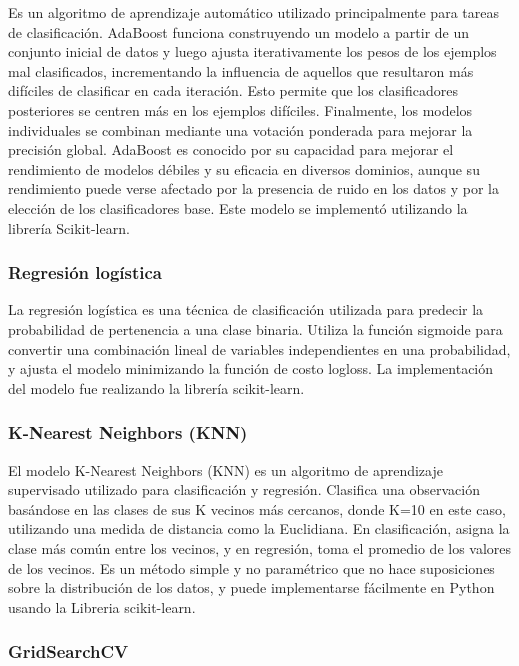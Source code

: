 \documentclass[
  number,
  preprint,
  3p,
  twocolumn]{elsarticle}
\begin{document}
Es un algoritmo de aprendizaje automático utilizado principalmente para
tareas de clasificación. AdaBoost funciona construyendo un modelo a
partir de un conjunto inicial de datos y luego ajusta iterativamente los
pesos de los ejemplos mal clasificados, incrementando la influencia de
aquellos que resultaron más difíciles de clasificar en cada iteración.
Esto permite que los clasificadores posteriores se centren más en los
ejemplos difíciles. Finalmente, los modelos individuales se combinan
mediante una votación ponderada para mejorar la precisión global.
AdaBoost es conocido por su capacidad para mejorar el rendimiento de
modelos débiles y su eficacia en diversos dominios, aunque su
rendimiento puede verse afectado por la presencia de ruido en los datos
y por la elección de los clasificadores base. Este modelo se implementó
utilizando la librería Scikit-learn.

\subsubsection{Regresión logística}\label{regresiuxf3n-loguxedstica}

La regresión logística es una técnica de clasificación utilizada para
predecir la probabilidad de pertenencia a una clase binaria. Utiliza la
función sigmoide para convertir una combinación lineal de variables
independientes en una probabilidad, y ajusta el modelo minimizando la
función de costo logloss. La implementación del modelo fue realizando la
librería scikit-learn.

\subsubsection{K-Nearest Neighbors (KNN)}\label{k-nearest-neighbors-knn}

El modelo K-Nearest Neighbors (KNN) es un algoritmo de aprendizaje
supervisado utilizado para clasificación y regresión. Clasifica una
observación basándose en las clases de sus K vecinos más cercanos, donde
K=10 en este caso, utilizando una medida de distancia como la
Euclidiana. En clasificación, asigna la clase más común entre los
vecinos, y en regresión, toma el promedio de los valores de los vecinos.
Es un método simple y no paramétrico que no hace suposiciones sobre la
distribución de los datos, y puede implementarse fácilmente en Python
usando la Libreria scikit-learn.

\subsubsection{GridSearchCV}\label{gridsearchcv}
\end{document}
